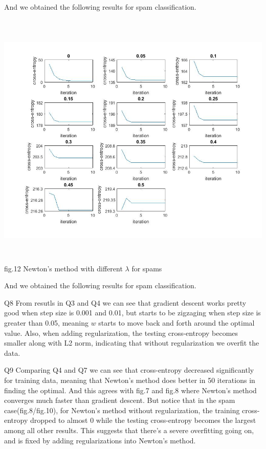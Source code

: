 \documentclass[12pt]{article}
\newenvironment{problem}[2][Problem]{\begin{trivlist}
\item[\hskip \labelsep {\bfseries #1}\hskip \labelsep {\bfseries #2}]}{\end{trivlist}}
\begin{document}
\begin{problem} {3.2 Newton's Method}
\begin{center}
\end{center}
And we obtained the following results for spam classification.
\begin{center}
		\includegraphics[height=12.5cm]{spam_newtons.jpg}{\\fig.12 Newton's method with different $\lambda$ for spams}
\end{center}
And we obtained the following results for spam classification.
\item{Q8}
From resutls in Q3 and Q4 we can see that gradient descent works pretty good when step size is 0.001 and 0.01, but starts to be zigzaging when step size is greater than 0.05, meaning $w$ starts to move back and forth around the optimal value. Also, when adding regularization, the testing cross-entropy becomes smaller along with L2 norm, indicating that without regularization we overfit the data.\\
\item{Q9}
Comparing Q4 and Q7 we can see that cross-entropy decreased significantly for training data, meaning that Newton's method does better in 50 iterations in finding the optimal. And this agrees with fig.7 and fig.8 where Newton's method converges much faster than gradient descent. But notice that in the spam case(fig.8/fig.10), for Newton's method without regularization, the training cross-entropy dropped to almost 0 while the testing cross-entropy becomes the largest among all other results. This suggests that there's a severe overfitting going on, and is fixed by adding regularizations into Newton's method.

\end{problem}


\end{document}
